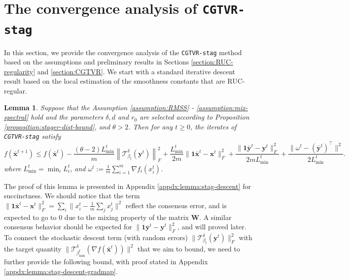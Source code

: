 \documentclass{article}
\newtheorem{lemma}[theorem]{Lemma}
\newcommand{\cT}{\mathcal{T}}
\newcommand{\ctdb}{\mathcal{T}^\delta_{\beta_t}}
\newcommand{\byt}{\mathbf{y}^t}
\newcommand{\xit}{x_{i}^{t}}
\newcommand{\bbxt}{\bar{\mathbf{x}}^t}
\newcommand{\bbxte}{\bar{\mathbf{x}}^{t+1}}
\newcommand{\bbyt}{\bar{\mathbf{y}}^t}
\newcommand{\bW}{\mathbf{W}}
\newcommand{\bone}{\mathbf{1}}
\begin{document}
\section{The convergence analysis of \texttt{CGTVR-stag}}
\label{section:cvg-analysis}
In this section, we provide the convergence analysis of the \texttt{CGTVR-stag} method based on the assumptions and preliminary results in Sections \ref{section:RUC-regularity} and \ref{section:CGTVR}. We start with a standard iterative descent result based on the local estimation of the smoothness constants that are RUC-regular. 

\begin{lemma}
\label{lemma:stag-descent}
Suppose that the Assumption \ref{assumption:RMSS} - \ref{assumption:mix-spectral} hold and the parameters $\delta,d$ and $r_0$ are selected according to Proposition \ref{proposition:stager-dist-bound}, and $\theta>2$. Then for any $t\geq0$, the iterates of \texttt{CGTVR-stag} satisfy
\begin{equation}
\label{lm:stag-descent-main}
f(\bbxte) \leq f(\bbxt)  -  \frac{(\theta-2)L_{\min}^t}{m} \left\|\ctdb(\byt)\right\|_F^2 +  \frac{L_{\min}^t}{2m}\|\mathbf{1}\bar{\mathbf{x}}^t-\mathbf{x}^t\|^2_F + \frac{\|\bone\bbyt - \byt\|^2_F}{2mL_{\min}^t}+ \frac{\|\omega^t-(\bbyt)^\top\|^2}{2 L_{\min}^t}.
\end{equation}
where $L^t_{\min}=\min_i{L_i^t}$, and $\omega^t:=\frac{1}{m}\sum_{i=1}^m\nabla f_i(\xit)$.
\end{lemma} 

The proof of this lemma is presented in Appendix \ref{appdx:lemma:stag-descent} for succinctness. We should notice that the term $\|\mathbf{1}\bar{\mathbf{x}}^t-\mathbf{x}^t\|^2_F = \sum_i\|x_i^t-\frac{1}{m}\sum_jx_j^t\|^2$ reflect the consensus error, and is expected to go to $0$ due to the mixing property of the matrix $\bW$. A similar consensus behavior should be expected for  $\|\mathbf{1}\bar{\mathbf{y}}^t-\mathbf{y}^t\|^2_F$, and will proved later.  To connect the stochastic descent term (with random errors) $\|\ctdb(\byt)\|_F^2$ with the target quantity $\|\cT_{\beta_{\min}^t}^\delta(\nabla f(\bbxt))\|^2$ that we aim to bound, we need to further provide the following bound, with proof stated in Appendix \ref{appdx:lemma:stag-descent-gradmap}.
\end{document}
